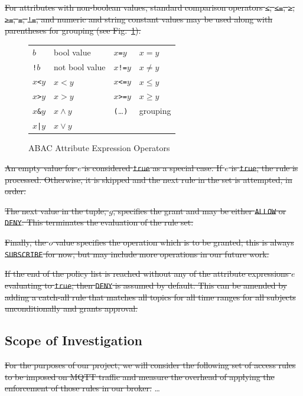 \documentclass[sigconf, nonacm]{acmart}
\begin{document}
\sout{For attributes with non-boolean values, standard comparison operators 
{\tt<},
{\tt<=},
{\tt>},
{\tt>=},
{\tt=},
{\tt!=},
and numeric and string constant values may be used along with parentheses for grouping (see Fig.~\ref{abac-ops}).}
\begin{figure}
    \begin{center}
    \begin{tabular}{llll}
    $b$&bool value&
    $x$\tt=$y$&$x=y$\\
    \tt!$b$&not bool value&
    $x$\tt!=$y$&$x\ne y$\\
    $x$\tt<$y$&$x<y$&
    $x$\tt<=$y$&$x\le y$\\
    $x$\tt>$y$&$x>y$&
    $x$\tt>=$y$&$x\ge y$\\
    $x$\tt\&$y$&$x\wedge y$&
    {\tt(}\dots{\tt)}&grouping\\
    $x$\tt|$y$&$x\vee y$\\
    \end{tabular}
    \caption{ABAC Attribute Expression Operators\label{abac-ops}}
    \end{center}
\end{figure}

\sout{An empty value for $e$ is considered {\tt true} as a special case. If $e$ is {\tt true}, the rule is processed. Otherwise, it is skipped and the next rule in the set is attempted, in order.}

\sout{The next value in the tuple, $g$, specifies the grant and may be either {\tt ALLOW} or {\tt DENY}. This terminates the
evaluation of the rule set.}

\sout{Finally, the $o$ value specifies the operation which is to be granted; this is always {\tt SUBSCRIBE} for now, but may include more operations in our future work.}

\sout{If the end of the policy list is reached without any of the attribute expressions $e$ evaluating to {\tt true}, then
{\tt DENY} is assumed by default. This can be amended by adding a catch-all rule that matches all topics for all time ranges for all subjects unconditionally and grants approval.}

\subsection{Scope of Investigation}
\sout{For the purposes of our project, we will consider the following set of access rules to be imposed on MQTT traffic and measure the overhead of applying the enforcement of those rules in our broker.}
{\color{red}\dots}
\end{document}
